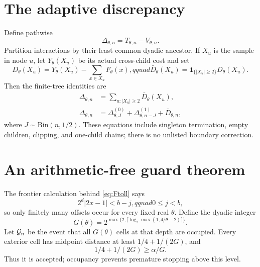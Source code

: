 \documentclass[11pt]{article}
\numberwithin{equation}{section}
\theoremstyle{definition}\newtheorem{definition}[theorem]{Definition}
\theoremstyle{remark}\newtheorem{remark}[theorem]{Remark}
\newcommand{\1}{\mathbf 1}\newcommand{\cD}{\mathcal D}
\begin{document}
\section{The adaptive discrepancy}\label{sec:disc}
Define pathwise
\begin{equation}\Delta_{\theta,n}=T_{\theta,n}-V_{\theta,n}.   \label{eq:Deltadef}
\end{equation}
Partition interactions by their least common dyadic ancestor.  If $X_u$ is
the sample in node $u$, let $Y_\theta(X_u)$ be its actual cross-child cost
and set
\begin{equation}
 D_\theta(X_u)=Y_\theta(X_u)-\sum_{x\in X_u}F_\theta(x),qquad
 \bar D_\theta(X_u)=\1_{\{|X_u|\ge2\}}D_\theta(X_u).          \label{eq:rootdefect}
\end{equation}
Then the finite-tree identities are
\begin{align}
 \Delta_{\theta,n}&=\sum_{u:|X_u|\ge2}\bar D_\theta(X_u),     \label{eq:finite-tree}\\
 \Delta_{\theta,n}&=\Delta^{(0)}_{\theta,J}+
 \Delta^{(1)}_{\theta,n-J}+\bar D_{\theta,n},                 \label{eq:Drec}
\end{align}
where $J\sim\mathrm{Bin}(n,1/2)$.  These equations include singleton
termination, empty children, clipping, and one-child chains; there is no
unlisted boundary correction.

\clearpage
\section{An arithmetic-free guard theorem}\label{sec:guard}
The frontier calculation behind \eqref{eq:Ftoll} says
\begin{equation}2^d|2x-1|<b-j,qquad 0\le j<b,                 \label{eq:frontier}
\end{equation}
so only finitely many offsets occur for every fixed real $\theta$.
Define the dyadic integer
\begin{equation}
 G(\theta)=2^{\max\{2,\lceil\log_2\max(1,4/\theta-2)\rceil\}}. \label{eq:guard}
\end{equation}
Let $\mathcal G_n$ be the event that all $G(\theta)$ cells at that depth are
occupied.  Every exterior cell has midpoint distance at least
$1/4+1/(2G)$, and
\begin{equation}1/4+1/(2G)\ge\alpha/G.                         \label{eq:guardineq}
\end{equation}
Thus it is accepted; occupancy prevents premature stopping above this level.
\end{document}
